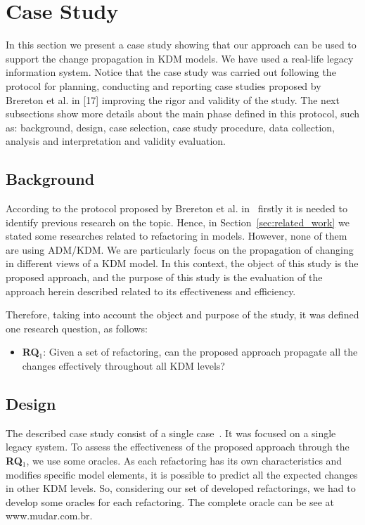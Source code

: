 
\section{Case Study}

In this section we present a case study showing that our approach can be used to support the change propagation in KDM models. We have used a real-life legacy information system. 
Notice that the case study was carried out following the protocol for planning, conducting and reporting case studies proposed by Brereton et al. in [17] improving the rigor and validity of the study. The next subsections show more details about the main phase defined in this protocol, such as: background, design, case selection, case study procedure, data collection, analysis and interpretation and validity evaluation.

\subsection{Background}

According to the protocol proposed by Brereton et al. in~\cite{Brereton:2008} firstly it is needed to identify previous research on the topic. Hence, in Section~\ref{sec:related_work} we stated some researches related to refactoring in models. However, none of them are using ADM/KDM. We are particularly focus on the propagation of changing in different views of a KDM model. In this context, the object of this study is the proposed approach, and the purpose of this study is the evaluation of the approach herein described related to its effectiveness and efficiency.

Therefore, taking into account the object and purpose of the study, it was defined one research question, as follows:

\begin{itemize}
\item \textbf{RQ$_1$}: Given a set of refactoring, can the proposed approach propagate all the changes effectively throughout all KDM levels?
\end{itemize}


\subsection{Design}

The described case study consist of a single case~\cite{Brereton:2008}. It was focused on a single legacy system. To assess the effectiveness of the proposed approach through the \textbf{RQ$_1$}, we use some oracles. As each refactoring has its own characteristics and modifies specific model elements, it is possible to predict all the expected changes in other KDM levels. So, considering our set of developed refactorings, we had to develop some oracles for each refactoring. The complete oracle can be see at www.mudar.com.br.


